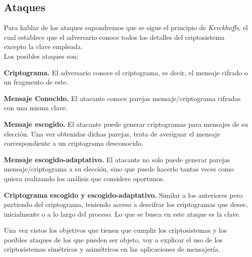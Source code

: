 \subsection{Ataques}
Para hablar de los ataques supondremos que se sigue el principio de \emph{Kerckhoffs}, el cual establece que el adversario conoce todos los detalles del criptosistema excepto la clave empleada.\\
Los posibles ataques son:
\begin{description}
		\item \textbf{Criptograma.} El adversario conoce el criptograma, es decir, el mensaje cifrado o un fragmento de este.
		\item \textbf{Mensaje Conocido.} El atacante conoce parejas mensaje/criptograma cifradas con una misma clave.
		\item \textbf{Mensaje escogido.} El atacante puede generar criptogramas para mensajes de su elección. Una vez obtenidas dichas parejas, trata de averiguar el mensaje correspondiente a un criptograma desconocido.
		\item \textbf{Mensaje escogido-adaptativo.} El atacante no solo puede generar parejas mensaje/criptograma a su elección, sino que puede hacerlo tantas veces como quiera realizando los análisis que considere oportunos.
		\item \textbf{Criptograma escogido y escogido-adaptativo.} Similar a los anteriores pero partiendo del criptograma, teniendo acceso a descifrar los criptogramas que desee, inicialmente o a lo largo del proceso. Lo que se busca en este ataque es la clave.
\end{description}

Una vez vistos los objetivos que tienen que cumplir los criptosistemas y los posibles ataques de los que pueden ser objeto, voy a explicar el uso de los criptosistemas simétricos y asimétricos en las aplicaciones de mensajería.\\

